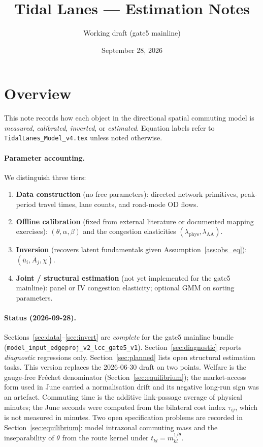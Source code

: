 \documentclass[11pt]{article}
\title{Tidal Lanes --- Estimation Notes}
\author{Working draft (gate5 mainline)}
\date{September 28, 2026}
\newcommand{\ubar}{\bar u}
\newcommand{\Abar}{\bar A}
\newcommand{\phys}{\mathrm{phys}}
\newcommand{\AAcal}{\mathrm{AA}}
\begin{document}
\maketitle

\section{Overview}\label{sec:overview}

This note records how each object in the directional spatial commuting
model is \emph{measured}, \emph{calibrated}, \emph{inverted}, or
\emph{estimated}.  Equation labels refer to
\texttt{TidalLanes\_Model\_v4.tex} unless noted otherwise.

\paragraph{Parameter accounting.}
We distinguish three tiers:
\begin{enumerate}[leftmargin=2em]
  \item \textbf{Data construction} (no free parameters): directed
        network primitives, peak-period travel times, lane counts, and
        road-mode OD flows.
  \item \textbf{Offline calibration} (fixed from external literature or
        documented mapping exercises): $(\theta,\alpha,\beta)$ and the
        congestion elasticities $(\lambda_{\phys},\lambda_{\AAcal})$.
  \item \textbf{Inversion} (recovers latent fundamentals given
        Assumption~\ref{ass:obs_eq}): $(\ubar_i,\Abar_j,\chi)$.
  \item \textbf{Joint / structural estimation} (not yet implemented for
        the gate5 mainline): panel or IV congestion elasticity; optional
        GMM on sorting parameters.
\end{enumerate}

\paragraph{Status (2026-09-28).}
Sections~\ref{sec:data}--\ref{sec:invert} are \emph{complete} for the
gate5 mainline bundle
(\texttt{model\_input\_edgeproj\_v2\_lcc\_gate5\_v1}).
Section~\ref{sec:diagnostic} reports \emph{diagnostic} regressions only.
Section~\ref{sec:planned} lists open structural estimation tasks.
This version replaces the 2026-06-30 draft on two points. Welfare is the
gauge-free Fr\'echet denominator (Section~\ref{sec:equilibrium}); the
market-access form used in June carried a normalisation drift and its
negative long-run sign was an artefact. Commuting time is the additive
link-passage average of physical minutes; the June seconds were computed
from the bilateral cost index $\tau_{ij}$, which is not measured in
minutes. Two open specification problems are recorded in
Section~\ref{sec:equilibrium}: model intrazonal commuting mass and the
inseparability of $\theta$ from the route kernel under $t_{kl}=m_{kl}^{1/\theta}$.
\end{document}
